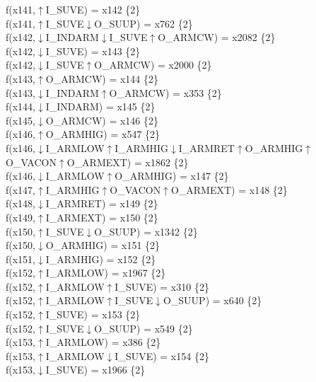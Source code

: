 f(x141,$\uparrow$I\_SUVE) = x142 \{2\} \\  
f(x141,$\uparrow$I\_SUVE$\downarrow$O\_SUUP) = x762 \{2\} \\  
f(x142,$\downarrow$I\_INDARM$\downarrow$I\_SUVE$\uparrow$O\_ARMCW) = x2082 \{2\} \\  
f(x142,$\downarrow$I\_SUVE) = x143 \{2\} \\  
f(x142,$\downarrow$I\_SUVE$\uparrow$O\_ARMCW) = x2000 \{2\} \\  
f(x143,$\uparrow$O\_ARMCW) = x144 \{2\} \\  
f(x143,$\downarrow$I\_INDARM$\uparrow$O\_ARMCW) = x353 \{2\} \\  
f(x144,$\downarrow$I\_INDARM) = x145 \{2\} \\  
f(x145,$\downarrow$O\_ARMCW) = x146 \{2\} \\  
f(x146,$\uparrow$O\_ARMHIG) = x547 \{2\} \\  
f(x146,$\downarrow$I\_ARMLOW$\uparrow$I\_ARMHIG$\downarrow$I\_ARMRET$\uparrow$O\_ARMHIG$\uparrow$O\_VACON$\uparrow$O\_ARMEXT) = x1862 \{2\} \\  
f(x146,$\downarrow$I\_ARMLOW$\uparrow$O\_ARMHIG) = x147 \{2\} \\  
f(x147,$\uparrow$I\_ARMHIG$\uparrow$O\_VACON$\uparrow$O\_ARMEXT) = x148 \{2\} \\  
f(x148,$\downarrow$I\_ARMRET) = x149 \{2\} \\  
f(x149,$\uparrow$I\_ARMEXT) = x150 \{2\} \\  
f(x150,$\uparrow$I\_SUVE$\downarrow$O\_SUUP) = x1342 \{2\} \\  
f(x150,$\downarrow$O\_ARMHIG) = x151 \{2\} \\  
f(x151,$\downarrow$I\_ARMHIG) = x152 \{2\} \\  
f(x152,$\uparrow$I\_ARMLOW) = x1967 \{2\} \\  
f(x152,$\uparrow$I\_ARMLOW$\uparrow$I\_SUVE) = x310 \{2\} \\  
f(x152,$\uparrow$I\_ARMLOW$\uparrow$I\_SUVE$\downarrow$O\_SUUP) = x640 \{2\} \\  
f(x152,$\uparrow$I\_SUVE) = x153 \{2\} \\  
f(x152,$\uparrow$I\_SUVE$\downarrow$O\_SUUP) = x549 \{2\} \\  
f(x153,$\uparrow$I\_ARMLOW) = x386 \{2\} \\  
f(x153,$\uparrow$I\_ARMLOW$\downarrow$I\_SUVE) = x154 \{2\} \\  
f(x153,$\downarrow$I\_SUVE) = x1966 \{2\} \\  
